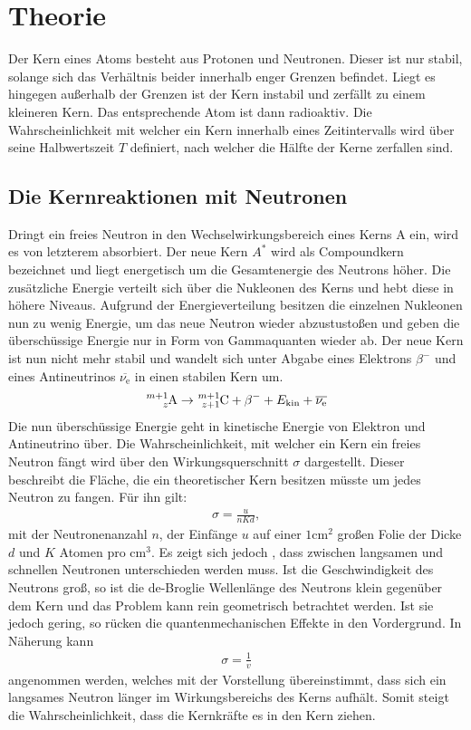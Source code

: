 \section{Theorie}
Der Kern eines Atoms besteht aus Protonen und Neutronen. Dieser ist nur stabil, solange sich das Verhältnis beider innerhalb enger Grenzen 
befindet. Liegt es hingegen außerhalb der Grenzen ist der Kern instabil und 
zerfällt zu einem kleineren Kern. Das entsprechende Atom ist dann radioaktiv. Die Wahrscheinlichkeit mit welcher ein Kern 
innerhalb eines Zeitintervalls wird über seine Halbwertszeit $T$ definiert, nach welcher die Hälfte der Kerne zerfallen sind.
\subsection{Die Kernreaktionen mit Neutronen}
Dringt ein freies Neutron in den Wechselwirkungsbereich eines Kerns A ein, wird es von letzterem absorbiert. Der neue Kern $A^*$ wird 
als Compoundkern bezeichnet und liegt energetisch um die Gesamtenergie des Neutrons höher. Die zusätzliche Energie verteilt sich über die Nukleonen des Kerns und hebt diese in höhere Niveaus. Aufgrund der Energieverteilung besitzen die einzelnen Nukleonen nun zu wenig Energie, um das neue Neutron wieder abzustustoßen und geben die überschüssige Energie nur in Form von Gammaquanten wieder ab. Der neue Kern ist nun nicht mehr stabil und wandelt sich unter Abgabe eines Elektrons $\beta^-$ und eines Antineutrinos $\overline{\nu_\text{e}}$ in einen stabilen Kern um.
\begin{align}
  \ce{^{m+1}_{z}A} \rightarrow \ce{^{m+1}_{z+1}C} + \beta^-  + E_\text{kin} + \overline{\nu_\text{e}}
\end{align}
Die nun überschüssige Energie geht in kinetische Energie von Elektron und Antineutrino über.
Die Wahrscheinlichkeit, mit welcher ein Kern ein freies Neutron fängt wird über den Wirkungsquerschnitt $\sigma$ dargestellt. Dieser 
beschreibt die Fläche, die ein theoretischer Kern besitzen müsste um jedes Neutron zu fangen. Für ihn gilt:
\begin{align}
  \sigma = \frac{u}{n K d},
\end{align}
mit der Neutronenanzahl $n$, der Einfänge $u$ auf einer $\text{1}\text{cm}^2$ großen Folie der Dicke $d$ und $K$ Atomen 
pro $\text{cm}^3$.
Es zeigt sich jedoch , dass zwischen langsamen und schnellen Neutronen unterschieden werden muss. Ist die Geschwindigkeit des
Neutrons groß, so ist die de-Broglie Wellenlänge des Neutrons klein gegenüber dem Kern und das Problem kann rein geometrisch betrachtet werden. 
Ist sie jedoch gering, so rücken die quantenmechanischen Effekte in den Vordergrund. In Näherung kann
 \begin{align}
   \sigma = \frac{1}{v}
 \end{align}
 angenommen werden, welches mit der Vorstellung übereinstimmt, dass sich ein langsames Neutron länger im Wirkungsbereichs des 
 Kerns aufhält. Somit steigt die Wahrscheinlichkeit, dass die Kernkräfte es in den Kern ziehen.
